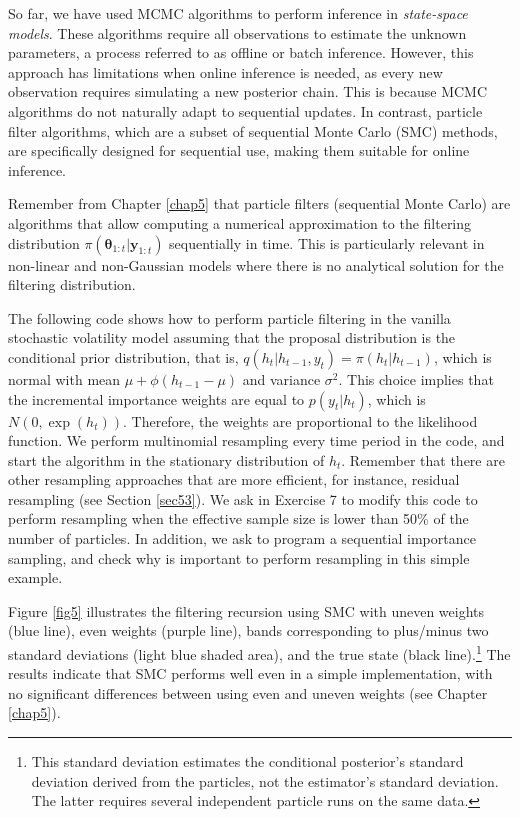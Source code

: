 So far, we have used MCMC algorithms to perform inference in \textit{state-space models}. These algorithms require all observations to estimate the unknown parameters, a process referred to as offline or batch inference. However, this approach has limitations when online inference is needed, as every new observation requires simulating a new posterior chain. This is because MCMC algorithms do not naturally adapt to sequential updates. In contrast, particle filter algorithms, which are a subset of sequential Monte Carlo (SMC) methods, are specifically designed for sequential use, making them suitable for online inference.    
     
Remember from Chapter \ref{chap5} that particle filters (sequential Monte Carlo) are algorithms that allow computing a numerical approximation to the filtering distribution $\pi(\bm{\theta}_{1:t}|\bm{y}_{1:t})$ sequentially in time. This is particularly relevant in non-linear and non-Gaussian models where there is no analytical solution for the filtering distribution.

The following code shows how to perform particle filtering in the vanilla stochastic volatility model assuming that the proposal distribution is the conditional prior distribution, that is, $q(h_t|h_{t-1},y_t)=\pi(h_t|h_{t-1})$, which is normal with mean $\mu+\phi(h_{t-1}-\mu)$ and variance $\sigma^2$. This choice implies that the incremental importance weights are equal to $p(y_t|h_t)$, which is $N(0,\exp(h_t))$. Therefore, the weights are proportional to the likelihood function. We perform multinomial resampling every time period in the code, and start the algorithm in the stationary distribution of $h_t$. Remember that there are other resampling approaches that are more efficient, for instance, residual resampling (see Section \ref{sec53}). We ask in Exercise 7 to modify this code to perform resampling when the effective sample size is lower than 50\% of the number of particles. In addition, we ask to program a sequential importance sampling, and check why is important to perform resampling in this simple example. 

Figure \ref{fig5} illustrates the filtering recursion using SMC with uneven weights (blue line), even weights (purple line), bands corresponding to plus/minus two standard deviations (light blue shaded area), and the true state (black line).\footnote{This standard deviation estimates the conditional posterior's standard deviation derived from the particles, not the estimator's standard deviation. The latter requires several independent particle runs on the same data.} The results indicate that SMC performs well even in a simple implementation, with no significant differences between using even and uneven weights (see Chapter \ref{chap5}).

